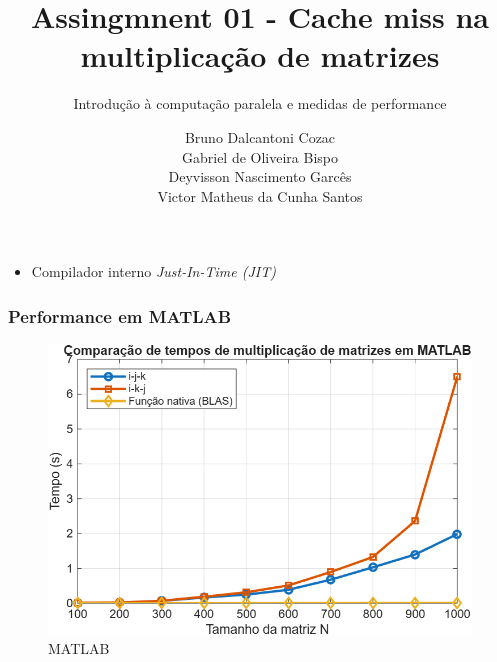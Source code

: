\documentclass[11pt]{beamer}
\theoremstyle{definition}
\begin{document}
	\author{ Bruno Dalcantoni Cozac \\
		  	 Gabriel de Oliveira Bispo\\
			 Deyvisson Nascimento Garcês \\
			 Victor Matheus da Cunha Santos \\ }
	\title{Assingmnent 01 - Cache miss na multiplicação de matrizes}
	\subtitle{Introdução à computação paralela e medidas de performance}
	\subject{}

	\begin{frame}[plain]
		\maketitle
	\end{frame}

\begin{frame}
	\begin{itemize}
		\item Compilador interno \textit{Just-In-Time (JIT)}
	\end{itemize}
\end{frame}
\begin{frame}
		\frametitle{Performance em MATLAB}
	\begin{figure}[H]
		\centering
		\includegraphics[width=0.5\linewidth]{../matlab/untitled1.png}
		\caption{MATLAB}
		\label{fig:matmultr2022}
	\end{figure}
	
\end{frame}
\end{document}
